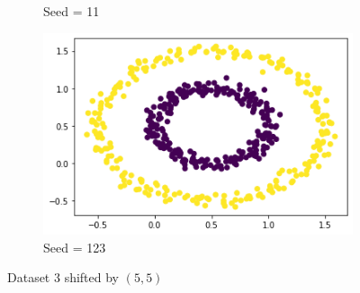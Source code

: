 \documentclass[12pt, fleqn]{article}
\begin{document}
\begin{figure}[H]
\begin{subfigure}[H]{0.35\textwidth}
        \caption[]{Seed = 11}
    \end{subfigure}
    \begin{subfigure}[H]{0.35\textwidth}
        \centering
        \includegraphics[width=\textwidth]{plots/D3_shifted/K123.png}
        \caption[]{Seed = 123}
    \end{subfigure}
    \caption[]{Dataset 3 shifted by $(5, 5)$}
\end{figure}
\end{document}
